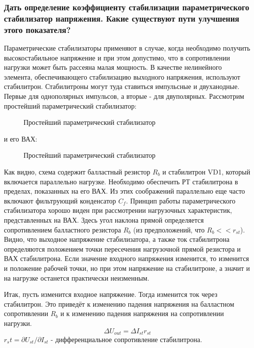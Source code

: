 \subsubsection{Дать определение коэффициенту стабилизации параметрического стабилизатор напряжения. Какие существуют пути улучшения этого показателя?}

Параметрические стабилизаторы применяют в случае, когда необходимо получить высокостабильное напряжение и при этом допустимо, что в сопротивлении нагрузки может быть рассеяна малая мощность. В качестве нелинейного элемента, обеспечивающего стабилизацию выходного напряжения, используют стабилитрон. Стабилитроны могут туда ставиться импульсные и двуханодные. Первые для однополярных импульсов, а вторые - для двуполярных. Рассмотрим простейший параметрический стабилизатор:

\begin{center}
	\begin{figure}[h!]
		\caption{Простейший параметрический стабилизатор}
	\end{figure}
\end{center}

и его ВАХ:

\begin{center}
	\begin{figure}[h!]
		\caption{Простейший параметрический стабилизатор}
		\label{pic:VAHp}
	\end{figure}
\end{center}

Как видно, схема содержит балластный резистор $R_b$ и стабилитрон VD1, который включается параллельно нагрузке. Необходимо обеспечить РТ стабилитрона в пределах, показанных на его ВАХ. Из этих соображений параллельно еще часто включают фильтрующий конденсатор $C_f$. Принцип работы параметрического стабилизатора хорошо виден при рассмотрении нагрузочных характеристик, представленных на ВАХ. Здесь угол наклона прямой определяется сопротивлением балластного резистора $R_b$ (из предположений, что $R_b << r_{st} $). Видно, что выходное напряжение стабилизатора, а также ток стабилитрона определяются положением точки пересечения нагрузочной прямой резистора и ВАХ стабилитрона. Если значение входного напряжения изменится, то изменится и положение рабочей точки, но при этом напряжение на стабилитроне, а значит и на нагрузке останется практически неизменным. 

Итак, пусть изменится входное напряжение. Тогда изменится ток через стабилитрон. Это приведёт к изменению падения напряжения на балластном сопротивлении $R_b$ и к изменению падения напряжения на сопротивлении нагрузки.
$$
\Delta U_{out} = \Delta I_{st}r_{st}
$$
$r_st = \partial U_{st}/\partial I_{st}$ - дифференциальное сопротивление стабилитрона.

